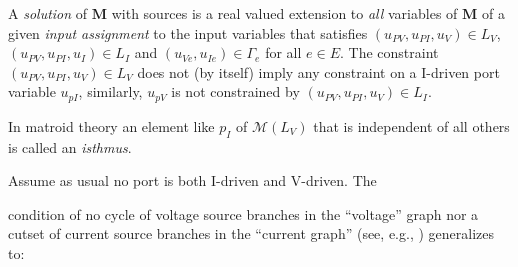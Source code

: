 \documentclass{article}
\DeclareMathOperator{\rank}{rank}
\newcommand{\sminus}{\backslash}
\newcommand{\extra}[1]{}
\begin{document}
A \textit{solution} of $\mathbf{M}$ with sources
is a real valued extension to \textit{all} variables of $\mathbf{M}$ 
of a given \textit{input assignment} to the input variables
that satisfies
$(u_{\mathit{PV}}, u_{\mathit{PI}}, u_V) \in L_V$,
$(u_{\mathit{PV}}, u_{\mathit{PI}}, u_I) \in L_I$
and
$(u_{\mathit{Ve}}, u_{\mathit{Ie}}) \in \Gamma_e$ for all
$e\in E$.
The constraint 
$(u_{\mathit{PV}}, u_{\mathit{PI}}, u_V) \in L_V$ 
does not (by itself) imply any constraint
on a I-driven port variable $u_{\mathit{pI}}$, similarly, 
$u_{\mathit{pV}}$ is not constrained
by 
$(u_{\mathit{PV}}, u_{\mathit{PI}}, u_V) \in L_I$.
\extra{Port variables are not constrained
by the constitutive laws $\Gamma$ (by themselves) either.}
In matroid theory an element like $p_I$ of
$\mathcal{M}(L_V)$ that is independent of all others
is called an \textit{isthmus}.

\extra{
In the language of matroid theory, we can call the element $p_I$ an 
\textit{isthmus} of the matroid $\mathcal{M}(L_V)$; similarly, $p_V$ is
an isthmus of $\mathcal{M}(L_I)$.  In general, the matroid represented by
a matrix is characterized by the collection $\mathcal{I}$ 
of \textit{independent sets} 
of matrix columns, where a set of columns is called independent when it is
linearly independent.  (Matroid theory studies what can be deduced by 
the following three axioms satisfied by $\mathcal{I}$: (1) 
$\mathcal{I}\neq\emptyset$. 
(2) If $A\subset B\in\mathcal{I}$ then $A\in\mathcal{I}$.  (3) 
If $A$, $B$ $\in\mathcal{I}$ and $|A|<|B|$, then there exists $e\in B\sminus A$ 
for which $A\cup\{e\}\in\mathcal{I}$.  For example, an isthmus $e$ is 
characterized by $A\cup\{e\}\in\mathcal{I}$ for all $A\in\mathcal{I}$.
The \textit{rank} of a subset $C\in U$ is the size of the largest independent
subset of $C$.  
}

\extra{We say a subspace pair problem with sources $S$ 
is \textit{well-posed} when for all input assignments there is a unique 
solution.}

Assume as usual 
no port is both I-driven and V-driven.
The 
\extra{well-known necessary condition
for an electrical network to have a unique 
solution for all choices of source values is}
condition of no cycle of voltage source branches
in the ``voltage'' graph nor a
cutset of current source branches in the ``current graph'' (see, e.g.,
\cite{ChensBook})
generalizes to:
\end{document}
